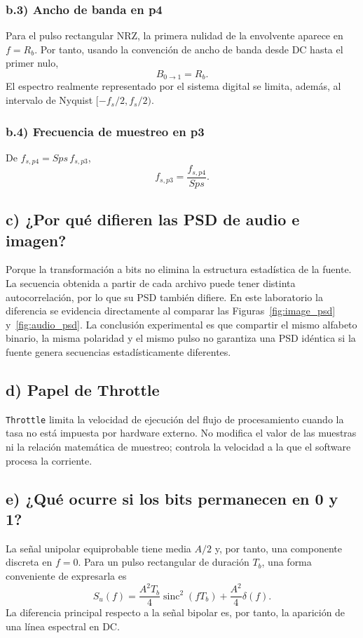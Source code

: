 \documentclass[journal]{IEEEtran}
\begin{document}
\subsubsection{b.3) Ancho de banda en p4}
Para el pulso rectangular NRZ, la primera nulidad de la envolvente aparece en $f=R_b$. Por tanto, usando la convención de ancho de banda desde DC hasta el primer nulo,
\begin{equation}
B_{0\rightarrow 1}=R_b.
\end{equation}
El espectro realmente representado por el sistema digital se limita, además, al intervalo de Nyquist $[-f_s/2,f_s/2)$.

\subsubsection{b.4) Frecuencia de muestreo en p3}
De $f_{s,p4}=Sps\,f_{s,p3}$,
\begin{equation}
f_{s,p3}=\frac{f_{s,p4}}{Sps}.
\end{equation}

\subsection{c) ¿Por qué difieren las PSD de audio e imagen?}
Porque la transformación a bits no elimina la estructura estadística de la fuente. La secuencia obtenida a partir de cada archivo puede tener distinta autocorrelación, por lo que su PSD también difiere. En este laboratorio la diferencia se evidencia directamente al comparar las Figuras~\ref{fig:image_psd} y~\ref{fig:audio_psd}. La conclusión experimental es que compartir el mismo alfabeto binario, la misma polaridad y el mismo pulso no garantiza una PSD idéntica si la fuente genera secuencias estadísticamente diferentes.

\subsection{d) Papel de Throttle}
\texttt{Throttle} limita la velocidad de ejecución del flujo de procesamiento cuando la tasa no está impuesta por hardware externo. No modifica el valor de las muestras ni la relación matemática de muestreo; controla la velocidad a la que el software procesa la corriente.

\subsection{e) ¿Qué ocurre si los bits permanecen en 0 y 1?}
La señal unipolar equiprobable tiene media $A/2$ y, por tanto, una componente discreta en $f=0$. Para un pulso rectangular de duración $T_b$, una forma conveniente de expresarla es
\begin{equation}
S_u(f)=\frac{A^2T_b}{4}\operatorname{sinc}^2(fT_b)+\frac{A^2}{4}\delta(f).
\end{equation}
La diferencia principal respecto a la señal bipolar es, por tanto, la aparición de una línea espectral en DC.
\end{document}
